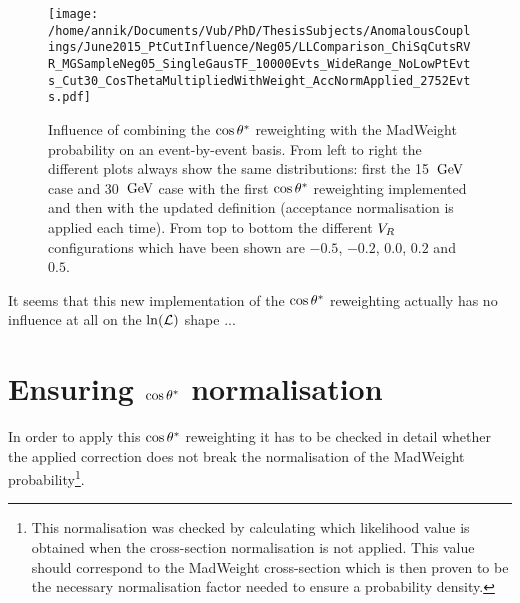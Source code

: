 \begin{figure}[h!t]
 \texttt{[image: /home/annik/Documents/Vub/PhD/ThesisSubjects/AnomalousCouplings/June2015\_PtCutInfluence/Neg05/LLComparison\_ChiSqCutsRVR\_MGSampleNeg05\_SingleGausTF\_10000Evts\_WideRange\_NoLowPtEvts\_Cut30\_CosThetaMultipliedWithWeight\_AccNormApplied\_2752Evts.pdf]}
 \caption{Influence of combining the $\cos \theta^{*}$ reweighting with the MadWeight probability on an event-by-event basis. From left to right the different plots always show the same distributions: first the 15 $\, \mathrm{GeV}$ case and 30 $\, \mathrm{GeV}$ case with the first $\cos \theta^{*}$ reweighting implemented and then with the updated definition (acceptance normalisation is applied each time). From top to bottom the different $V_{R}$ configurations which have been shown are $-0.5$, $-0.2$, $0.0$, $0.2$ and $0.5$.}
 \label{fig::CosThAccNormBothDefs}
 \end{figure}

It seems that this new implementation of the $\cos \theta^{*}$ reweighting actually has no influence at all on the $\ln(\mathcal{L})$ shape ...

\newpage
\section{Ensuring $\cos \theta^{*}$ normalisation}
In order to apply this $\cos \theta^{*}$ reweighting it has to be checked in detail whether the applied correction does not break the normalisation of the MadWeight probability\footnote{This normalisation was checked by calculating which likelihood value is obtained when the cross-section normalisation is not applied. This value should correspond to the MadWeight cross-section which is then proven to be the necessary normalisation factor needed to ensure a probability density.}.
